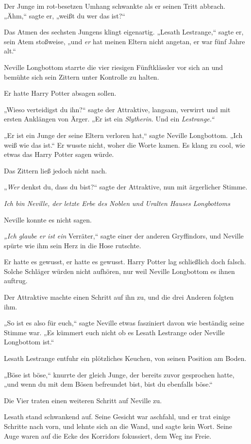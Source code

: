 {Der Junge im rot-besetzen Umhang schwankte als er seinen Tritt abbrach. „Ähm,“ sagte er, „weißt du wer das ist?“

Das Atmen des sechsten Jungens klingt eigenartig. „Lesath Lestrange,“ sagte er, sein Atem stoßweise, „und \emph{er} hat meinen Eltern nicht angetan, er war fünf Jahre alt.“

Neville Longbottom starrte die vier riesigen Fünftklässler vor sich an und bemühte sich sein Zittern unter Kontrolle zu halten.

Er hatte Harry Potter absagen sollen.

„Wieso verteidigst du ihn?“ sagte der Attraktive, langsam, verwirrt und mit ersten Anklängen von Ärger. „Er ist ein \emph{Slytherin}. Und ein \emph{Lestrange.“}

„Er ist ein Junge der seine Eltern verloren hat,“ sagte Neville Longbottom. „Ich weiß wie das ist.“ Er wusste nicht, woher die Worte kamen. Es klang zu cool, wie etwas das Harry Potter sagen würde.

Das Zittern ließ jedoch nicht nach.

„\emph{Wer} denkst du, dass du bist?“ sagte der Attraktive, nun mit ärgerlicher Stimme.

\emph{Ich bin Neville, der letzte Erbe des Noblen und Uralten Hauses Longbottoms \later}

Neville konnte es nicht sagen.

\emph{„Ich glaube er ist ein} Verräter,“ sagte einer der anderen Gryffindors, und Neville spürte wie ihm sein Herz in die Hose rutschte.

Er hatte es gewusst, er hatte es gewusst. Harry Potter lag schließlich doch falsch. Solche Schläger würden nicht aufhören, nur weil Neville Longbottom es ihnen auftrug.

Der Attraktive machte einen Schritt auf ihn zu, und die drei Anderen folgten ihm.

„So ist es also für euch,“ sagte Neville etwas fasziniert davon wie beständig seine Stimme war. „Es kümmert euch nicht ob es Lesath Lestrange oder Neville Longbottom ist.“

Lesath Lestrange entfuhr ein plötzliches Keuchen, von seinen Position am Boden.

„Böse ist böse,“ knurrte der gleich Junge, der bereits zuvor gesprochen hatte, „und wenn du mit dem Bösen befreundet bist, bist du ebenfalls böse.“

Die Vier traten einen weiteren Schritt auf Neville zu.

Lesath stand schwankend auf. Seine Gesicht war aschfahl, und er trat einige Schritte nach vorn, und lehnte sich an die Wand, und sagte kein Wort. Seine Auge waren auf die Ecke des Korridors fokussiert, dem Weg ins Freie.

}

